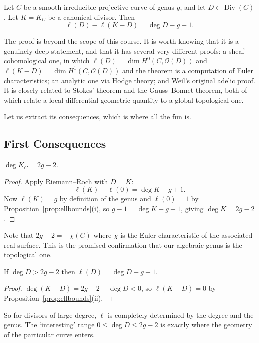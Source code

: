 \documentclass[a4paper]{scrartcl}
\newcommand{\Oh}{\mathcal{O}}
\DeclareMathOperator{\Div}{Div}
\begin{document}
\begin{theorem}\label{thm:RR}
	Let $C$ be a smooth irreducible projective curve of genus $g$, and let $D \in \Div(C)$. Let $K = K_C$ be a canonical divisor. Then
	$$\ell(D) - \ell(K - D) = \deg D - g + 1.$$
\end{theorem}

The proof is beyond the scope of this course. It is worth knowing that it is a genuinely deep statement, and that it has several very different proofs: a sheaf-cohomological one, in which $\ell(D) = \dim H^0(C,\Oh(D))$ and $\ell(K-D) = \dim H^1(C,\Oh(D))$ and the theorem is a computation of Euler characteristics; an analytic one via Hodge theory; and Weil's original adelic proof. It is closely related to Stokes' theorem and the Gauss--Bonnet theorem, both of which relate a local differential-geometric quantity to a global topological one.

Let us extract its consequences, which is where all the fun is.

\subsection{First Consequences}

\begin{corollary}\label{cor:degK}
	$\deg K_C = 2g - 2$.
\end{corollary}

\begin{proof}
	Apply Riemann--Roch with $D = K$:
	$$\ell(K) - \ell(0) = \deg K - g + 1.$$
	Now $\ell(K) = g$ by definition of the genus and $\ell(0) = 1$ by Proposition~\ref{prop:ellbounds}(i), so $g - 1 = \deg K - g + 1$, giving $\deg K = 2g-2$.
\end{proof}

Note that $2g-2 = -\chi(C)$ where $\chi$ is the Euler characteristic of the associated real surface. This is the promised confirmation that our algebraic genus is the topological one.

\begin{corollary}\label{cor:RRlarge}
	If $\deg D > 2g - 2$ then $\ell(D) = \deg D - g + 1$.
\end{corollary}

\begin{proof}
	$\deg(K - D) = 2g-2-\deg D < 0$, so $\ell(K-D) = 0$ by Proposition~\ref{prop:ellbounds}(ii).
\end{proof}

So for divisors of large degree, $\ell$ is completely determined by the degree and the genus. The `interesting' range $0 \leq \deg D \leq 2g-2$ is exactly where the geometry of the particular curve enters.
\end{document}
